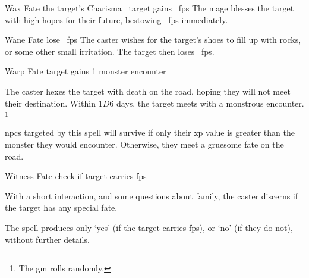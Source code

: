   {}%
  {Wax}%
  {Fate}%
  {the target's Charisma}%
  {~target gains ~\glspl{fp}}%
  {
    The mage blesses the target with high hopes for their future, bestowing ~\glspl{fp} immediately.
  }

  {}%
  {Wane}%
  {Fate}%
  {}%
  {lose \showDam~\glspl{fp}}%
  {
    The caster wishes for the target's shoes to fill up with rocks, or some other small irritation.
    The target then loses \showDam~\glspl{fp}.
  }


  {}%
  {Warp}%
  {Fate}%
  {}%
  {target gains 1 monster encounter}%
  {
    The caster hexes the target with death on the road, hoping they will not meet their destination.
    Within $1D6$ days, the target meets with a monstrous encounter.%
    \footnote{The \gls{gm} rolls randomly.}

    \Glspl{npc} targeted by this spell will survive if only their \gls{xp} value is greater than the monster they would encounter.
    Otherwise, they meet a gruesome fate on the road.
  }

  {}%
  {Witness}%
  {Fate}%
  {}%
  {check if target carries \glspl{fp}}%
  {
    With a short interaction, and some questions about family, the caster discerns if the target has any special fate.

    The spell produces only `yes' (if the target carries \glspl{fp}), or `no' (if they do not), without further details.
  }


